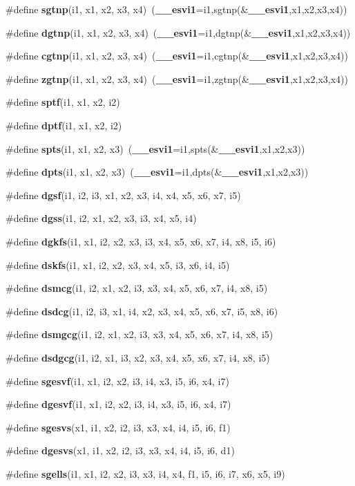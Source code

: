 \begin{CompactItemize}
\item 
\#define {\bf sgtnp}(i1, x1, x2, x3, x4)~({\bf \_\-\_\-esvi1}=i1,sgtnp(\&{\bf \_\-\_\-esvi1},x1,x2,x3,x4))
\item 
\#define {\bf dgtnp}(i1, x1, x2, x3, x4)~({\bf \_\-\_\-esvi1}=i1,dgtnp(\&{\bf \_\-\_\-esvi1},x1,x2,x3,x4))
\item 
\#define {\bf cgtnp}(i1, x1, x2, x3, x4)~({\bf \_\-\_\-esvi1}=i1,cgtnp(\&{\bf \_\-\_\-esvi1},x1,x2,x3,x4))
\item 
\#define {\bf zgtnp}(i1, x1, x2, x3, x4)~({\bf \_\-\_\-esvi1}=i1,zgtnp(\&{\bf \_\-\_\-esvi1},x1,x2,x3,x4))
\item 
\#define {\bf sptf}(i1, x1, x2, i2)
\item 
\#define {\bf dptf}(i1, x1, x2, i2)
\item 
\#define {\bf spts}(i1, x1, x2, x3)~({\bf \_\-\_\-esvi1}=i1,spts(\&{\bf \_\-\_\-esvi1},x1,x2,x3))
\item 
\#define {\bf dpts}(i1, x1, x2, x3)~({\bf \_\-\_\-esvi1}=i1,dpts(\&{\bf \_\-\_\-esvi1},x1,x2,x3))
\item 
\#define {\bf dgsf}(i1, i2, i3, x1, x2, x3, i4, x4, x5, x6, x7, i5)
\item 
\#define {\bf dgss}(i1, i2, x1, x2, x3, i3, x4, x5, i4)
\item 
\#define {\bf dgkfs}(i1, x1, i2, x2, x3, i3, x4, x5, x6, x7, i4, x8, i5, i6)
\item 
\#define {\bf dskfs}(i1, x1, i2, x2, x3, x4, x5, i3, x6, i4, i5)
\item 
\#define {\bf dsmcg}(i1, i2, x1, x2, i3, x3, x4, x5, x6, x7, i4, x8, i5)
\item 
\#define {\bf dsdcg}(i1, i2, i3, x1, i4, x2, x3, x4, x5, x6, x7, i5, x8, i6)
\item 
\#define {\bf dsmgcg}(i1, i2, x1, x2, i3, x3, x4, x5, x6, x7, i4, x8, i5)
\item 
\#define {\bf dsdgcg}(i1, i2, x1, i3, x2, x3, x4, x5, x6, x7, i4, x8, i5)
\item 
\#define {\bf sgesvf}(i1, x1, i2, x2, i3, i4, x3, i5, i6, x4, i7)
\item 
\#define {\bf dgesvf}(i1, x1, i2, x2, i3, i4, x3, i5, i6, x4, i7)
\item 
\#define {\bf sgesvs}(x1, i1, x2, i2, i3, x3, x4, i4, i5, i6, f1)
\item 
\#define {\bf dgesvs}(x1, i1, x2, i2, i3, x3, x4, i4, i5, i6, d1)
\item 
\#define {\bf sgells}(i1, x1, i2, x2, i3, x3, i4, x4, f1, i5, i6, i7, x6, x5, i9)
\item 

\end{CompactItemize}
